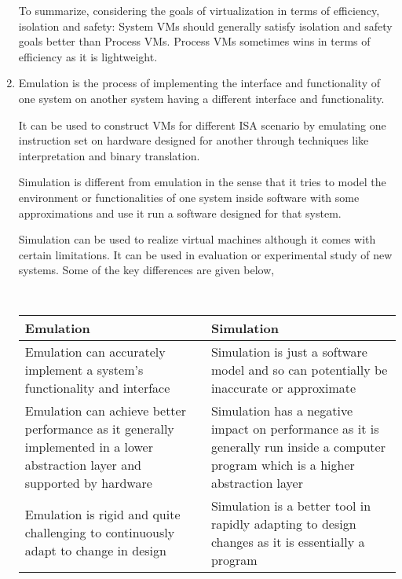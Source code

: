 \documentclass[11pt,a4paper,oneside]{article}
\begin{document}
\begin{enumerate}
		To summarize, considering the goals of virtualization in terms of efficiency, isolation and safety: System VMs should generally satisfy isolation and safety goals better than Process VMs. Process VMs sometimes wins in terms of efficiency as it is lightweight.
		
		\item Emulation is the process of implementing the interface and functionality of one system on another system having a different interface and functionality.
		
		It can be used to construct VMs for different ISA scenario by emulating one instruction set on hardware designed for another through techniques like interpretation and binary translation.
		
		Simulation is different from emulation in the sense that it tries to model the environment or functionalities of one system inside software with some approximations and use it run a software designed for that system.
		
		Simulation can be used to realize virtual machines although it comes with certain limitations. It can be used in evaluation or experimental study of new systems. Some of the key differences are given below,
		
		\begin{Verbatim}
					
		\end{Verbatim}
		
		\begin{center}
			\begin{tabular}{|p{6cm}|p{6cm}|}
				\hline 
				\textbf{Emulation}  & \textbf{Simulation} \\
				\hline
				Emulation can accurately implement a system's functionality and interface & Simulation is just a software model and so can potentially be inaccurate or approximate\\
				\hline
				Emulation can achieve better performance as it generally implemented in a lower abstraction layer and supported by hardware & Simulation has a negative impact on performance as it is generally run inside a computer program which is a higher abstraction layer\\
				\hline 
				Emulation is rigid and quite challenging to continuously adapt to change in design & Simulation is a better tool in rapidly adapting to design changes as it is essentially a program \\ 
				\hline
				\end{tabular}
		\end{center}	
		

\end{enumerate}
\end{document}
